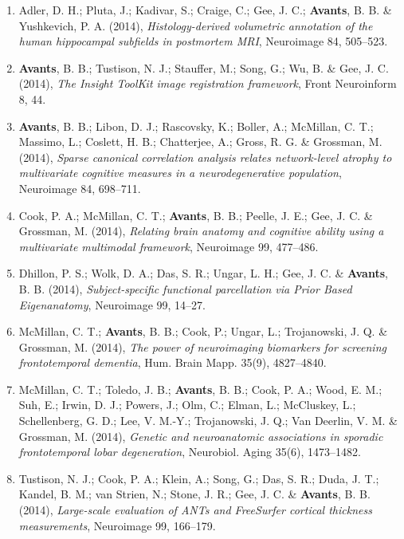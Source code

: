 \documentclass[11pt]{moderncv} %
\begin{document}
\begin{enumerate}
\item Adler, D. H.; Pluta, J.; Kadivar, S.; Craige, C.; Gee, J. C.; \textbf{Avants}, B. B. \&  Yushkevich, P. A. (2014), \textit{Histology-derived volumetric annotation of the human hippocampal subfields in postmortem MRI}, Neuroimage 84, 505--523.

\item \textbf{Avants}, B. B.; Tustison, N. J.; Stauffer, M.; Song, G.; Wu, B. \&  Gee, J. C. (2014), \textit{The Insight ToolKit image registration framework}, Front Neuroinform 8, 44.

\item  \textbf{Avants}, B. B.; Libon, D. J.; Rascovsky, K.; Boller, A.; McMillan, C. T.; Massimo, L.; Coslett, H. B.; Chatterjee, A.; Gross, R. G. \&  Grossman, M. (2014), \textit{Sparse canonical correlation analysis relates network-level atrophy to multivariate cognitive measures in a neurodegenerative population}, Neuroimage 84, 698--711.

\item  Cook, P. A.; McMillan, C. T.; \textbf{Avants}, B. B.; Peelle, J. E.; Gee, J. C. \&  Grossman, M. (2014), \textit{Relating brain anatomy and cognitive ability using a multivariate multimodal framework}, Neuroimage 99, 477--486.

\item  Dhillon, P. S.; Wolk, D. A.; Das, S. R.; Ungar, L. H.; Gee, J. C. \&  \textbf{Avants}, B. B. (2014), \textit{Subject-specific functional parcellation via Prior Based Eigenanatomy}, Neuroimage 99, 14--27.

\item  McMillan, C. T.; \textbf{Avants}, B. B.; Cook, P.; Ungar, L.; Trojanowski, J. Q. \&  Grossman, M. (2014), \textit{The power of neuroimaging biomarkers for screening frontotemporal dementia}, Hum. Brain Mapp. 35(9), 4827--4840.

\item  McMillan, C. T.; Toledo, J. B.; \textbf{Avants}, B. B.; Cook, P. A.; Wood, E. M.; Suh, E.; Irwin, D. J.; Powers, J.; Olm, C.; Elman, L.; McCluskey, L.; Schellenberg, G. D.; Lee, V. M.-Y.; Trojanowski, J. Q.; Van Deerlin, V. M. \&  Grossman, M. (2014), \textit{Genetic and neuroanatomic associations in sporadic frontotemporal lobar degeneration}, Neurobiol. Aging 35(6), 1473--1482.

\item  Tustison, N. J.; Cook, P. A.; Klein, A.; Song, G.; Das, S. R.; Duda, J. T.; Kandel, B. M.; van Strien, N.; Stone, J. R.; Gee, J. C. \&  \textbf{Avants}, B. B. (2014), \textit{Large-scale evaluation of ANTs and FreeSurfer cortical thickness measurements}, Neuroimage 99, 166--179.


\end{enumerate}
\end{document}
